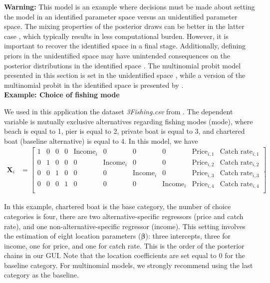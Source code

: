 \textbf{Warning:} This model is an example where decisions must be made about setting the model in an identified parameter space versus an unidentified parameter space. The mixing properties of the posterior draws can be better in the latter case \cite{mcculloch2000bayesian}, which typically results in less computational burden. However, it is important to recover the identified space in a final stage. Additionally, defining priors in the unidentified space may have unintended consequences on the posterior distributions in the identified space \cite{nobile2000comment}. The multinomial probit model presented in this section is set in the unidentified space \cite{McCulloch1994}, while a version of the multinomial probit in the identified space is presented by \cite{mcculloch2000bayesian}.\\

\textbf{Example: Choice of fishing mode}

We used in this application the dataset \textit{3Fishing.csv} from \cite[p.~491]{cameron05}. The dependent variable is mutually exclusive alternatives regarding fishing modes (mode), where beach is equal to 1, pier is equal to 2, private boat is equal to 3, and chartered boat (baseline alternative) is equal to 4. In this model, we have
{\small{
\begin{align*}
	\bm{X}_i & = \begin{bmatrix}
		1 & 0 & 0 & 0 & \text{Income}_i & 0 & 0 & 0 & \text{Price}_{i,1} & \text{Catch rate}_{i,1}\\ 
		0 & 1 & 0 & 0 & 0 & \text{Income}_i & 0 & 0 & \text{Price}_{i,2} & \text{Catch rate}_{i,2}\\
		0 & 0 & 1 & 0 & 0 & 0 & \text{Income}_i & 0 & \text{Price}_{i,3} & \text{Catch rate}_{i,3}\\
		0 & 0 & 0 & 1 & 0 & 0 & 0 & \text{Income}_i & \text{Price}_{i,4} & \text{Catch rate}_{i,4}\\
	\end{bmatrix}.
\end{align*}
}}

In this example, chartered boat is the base category, the number of choice categories is four, there are two alternative-specific regressors (price and catch rate), and one non-alternative-specific regressor (income). This setting involves the estimation of eight location parameters ($\bm\beta$): three intercepts, three for income, one for price, and one for catch rate. This is the order of the posterior chains in our GUI. Note that the location coefficients are set equal to 0 for the baseline category. For multinomial models, we strongly recommend using the last category as the baseline.

